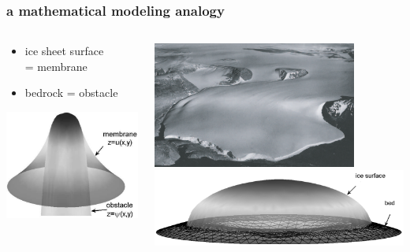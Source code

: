 \documentclass[hide notes,intlimits]{beamer}
\begin{document}
\begin{frame}
  \frametitle{a mathematical modeling analogy}

\begin{columns}
\begin{column}{0.35\textwidth}
\begin{itemize}
\item ice sheet surface \\ = \alert{membrane}
\item bedrock = \alert{obstacle}
\end{itemize}
\vfill
\begin{center}
\includegraphics[width=1.1\textwidth]{classicalobs}
\end{center}
\end{column}
\begin{column}{0.65\textwidth}
\begin{center}
\includegraphics[width=0.8\textwidth]{polaris} \\
\includegraphics[width=\textwidth]{capnonflatobs}
\end{center}
\end{column}
\end{columns}
\end{frame}
\end{document}
